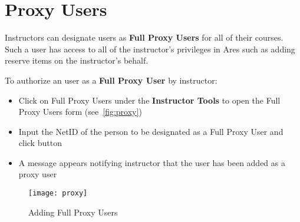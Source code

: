 \chapter{Proxy Users}
\label{ch:proxy}
Instructors can designate \ares users as \textbf{Full Proxy Users} for all of their courses. Such a user has access to all of the instructor’s privileges in Ares such as adding reserve items on the instructor’s behalf. 

To authorize an \ares user as a \textbf{Full Proxy User} by instructor:
\begin{itemize}
    \item Click on {\imp Full Proxy Users} under the \textbf{Instructor Tools} to open the Full Proxy Users form (see~\autoref{fig:proxy})
    \item Input the NetID of the person to be designated as a Full Proxy User and click  button
    \item A message appears notifying instructor that the user has been added as a proxy user
\end{itemize}

\vspace*{4ex}
\begin{figure}[h]
    \centering
    \texttt{[image: proxy]}
    \caption{Adding Full Proxy Users}
    \label{fig:proxy}
\end{figure}
